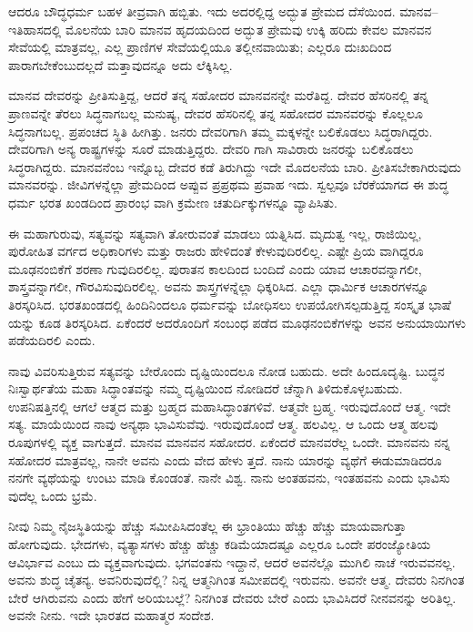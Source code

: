 ಆದರೂ ಬೌದ್ಧಧರ್ಮ ಬಹಳ ತೀವ್ರವಾಗಿ ಹಬ್ಬಿತು. ಇದು ಅದರಲ್ಲಿದ್ದ ಅದ್ಭುತ ಪ್ರೇಮದ ದೆಸೆಯಿಂದ. ಮಾನವ–ಇತಿಹಾಸದಲ್ಲಿ ಮೊಲನೆಯ ಬಾರಿ ಮಾನವ ಹೃದಯದಿಂದ ಅದ್ಭುತ ಪ್ರೇಮವು ಉಕ್ಕಿ ಹರಿದು ಕೇವಲ ಮಾನವನ ಸೇವೆಯಲ್ಲಿ ಮಾತ್ರವಲ್ಲ, ಎಲ್ಲ ಪ್ರಾಣಿಗಳ ಸೇವೆಯಲ್ಲಿಯೂ ತಲ್ಲೀನವಾಯಿತು; ಎಲ್ಲರೂ ದುಃಖದಿಂದ ಪಾರಾಗಬೇಕೆಂಬುದಲ್ಲದೆ ಮತ್ತಾವುದನ್ನೂ ಅದು ಲೆಕ್ಕಿಸಿಲ್ಲ.

ಮಾನವ ದೇವರನ್ನು ಪ್ರೀತಿಸುತ್ತಿದ್ದ, ಆದರೆ ತನ್ನ ಸಹೋದರ ಮಾನವನನ್ನೇ ಮರೆತಿದ್ದ. ದೇವರ ಹೆಸರಿನಲ್ಲಿ ತನ್ನ ಪ್ರಾಣವನ್ನೇ ತೆರಲು ಸಿದ್ಧನಾಗಬಲ್ಲ ಮನುಷ್ಯ, ದೇವರ ಹೆಸರಿನಲ್ಲಿ ತನ್ನ ಸಹೋದರ ಮಾನವರನ್ನು ಕೊಲ್ಲಲೂ ಸಿದ್ಧನಾಗಬಲ್ಲ. ಪ್ರಪಂಚದ ಸ್ಥಿತಿ ಹೀಗಿತ್ತು. ಜನರು ದೇವರಿಗಾಗಿ ತಮ್ಮ ಮಕ್ಕಳನ್ನೇ ಬಲಿಕೊಡಲು ಸಿದ್ಧರಾಗಿದ್ದರು. ದೇವರಿಗಾಗಿ ಅನ್ಯ ರಾಷ್ಟ್ರಗಳನ್ನು ಸೂರೆ ಮಾಡುತ್ತಿದ್ದರು. ದೇವರಿ ಗಾಗಿ ಸಾವಿರಾರು ಜನರನ್ನು ಬಲಿಕೊಡಲು ಸಿದ್ಧರಾಗಿದ್ದರು. ಮಾನವನೆಂಬ ಇನ್ನೊಬ್ಬ ದೇವರ ಕಡೆ ತಿರುಗಿದ್ದು ಇದೇ ಮೊದಲನೆಯ ಬಾರಿ. ಪ್ರೀತಿಸಬೇಕಾಗಿರುವುದು ಮಾನವರನ್ನು. ಜೀವಿಗಳನ್ನೆಲ್ಲಾ ಪ್ರೇಮದಿಂದ ಅಪ್ಪುವ ಪ್ರಪ್ರಥಮ ಪ್ರವಾಹ ಇದು. ಸ್ವಲ್ಪವೂ ಬೆರಕೆಯಾಗದ ಈ ಶುದ್ಧ ಧರ್ಮ ಭರತ ಖಂಡದಿಂದ ಪ್ರಾರಂಭ ವಾಗಿ ಕ್ರಮೇಣ ಚತುರ್ದಿಕ್ಕುಗಳನ್ನೂ ವ್ಯಾಪಿಸಿತು.

ಈ ಮಹಾಗುರುವು, ಸತ್ಯವನ್ನು ಸತ್ಯವಾಗಿ ತೋರುವಂತೆ ಮಾಡಲು ಯತ್ನಿಸಿದ. ಮೃದುತ್ವ ಇಲ್ಲ, ರಾಜಿಯಿಲ್ಲ, ಪುರೋಹಿತ ವರ್ಗದ ಅಧಿಕಾರಿಗಳು ಮತ್ತು ರಾಜರು ಹೇಳಿದಂತೆ ಕೇಳುವುದಿರಲಿಲ್ಲ. ಎಷ್ಟೇ ಪ್ರಿಯ ವಾಗಿದ್ದರೂ ಮೂಢನಂಬಿಕೆಗೆ ಶರಣಾ ಗುವುದಿರಲಿಲ್ಲ. ಪುರಾತನ ಕಾಲದಿಂದ ಬಂದಿದೆ ಎಂದು ಯಾವ ಆಚಾರವನ್ನಾಗಲೀ, ಶಾಸ್ತ್ರವನ್ನಾಗಲೀ, ಗೌರವಿಸುವುದಿರಲಿಲ್ಲ. ಅವನು ಶಾಸ್ತ್ರಗಳನ್ನೆಲ್ಲಾ ಧಿಕ್ಕರಿಸಿದ. ಎಲ್ಲಾ ಧಾರ್ಮಿಕ ಆಚಾರಗಳನ್ನೂ ತಿರಸ್ಕರಿಸಿದ. ಭರತಖಂಡದಲ್ಲಿ ಹಿಂದಿನಿಂದಲೂ ಧರ್ಮವನ್ನು ಬೋಧಿಸಲು ಉಪಯೋಗಿಸಲ್ಪಡುತ್ತಿದ್ದ ಸಂಸ್ಕೃತ ಭಾಷೆ ಯನ್ನು ಕೂಡ ತಿರಸ್ಕರಿಸಿದ. ಏಕೆಂದರೆ ಅದರೊಂದಿಗೆ ಸಂಬಂಧ ಪಡೆದ ಮೂಢನಂಬಿಕೆಗಳನ್ನು ಅವನ ಅನುಯಾಯಿಗಳು ಪಡೆಯದಿರಲಿ ಎಂದು.

ನಾವು ವಿವರಿಸುತ್ತಿರುವ ಸತ್ಯವನ್ನು ಬೇರೊಂದು ದೃಷ್ಟಿಯಿಂದಲೂ ನೋಡ ಬಹುದು. ಅದೇ ಹಿಂದೂದೃಷ್ಟಿ. ಬುದ್ಧನ ನಿಃಸ್ವಾರ್ಥತೆಯ ಮಹಾ ಸಿದ್ಧಾಂತವನ್ನು ನಮ್ಮ ದೃಷ್ಟಿಯಿಂದ ನೋಡಿದರೆ ಚೆನ್ನಾಗಿ ತಿಳಿದುಕೊಳ್ಳಬಹುದು. ಉಪನಿಷತ್ತಿನಲ್ಲಿ ಆಗಲೆ ಆತ್ಮದ ಮತ್ತು ಬ್ರಹ್ಮದ ಮಹಾಸಿದ್ಧಾಂತಗಳಿವೆ. ಆತ್ಮವೇ ಬ್ರಹ್ಮ. ಇರುವುದೊಂದೆ ಆತ್ಮ. ಇದೇ ಸತ್ಯ. ಮಾಯೆಯಿಂದ ನಾವು ಅನ್ಯಥಾ ಭಾವಿಸುವೆವು. ಇರುವುದೊಂದೆ ಆತ್ಮ. ಹಲವಿಲ್ಲ. ಆ ಒಂದು ಆತ್ಮ ಹಲವು ರೂಪುಗಳಲ್ಲಿ ವ್ಯಕ್ತ ವಾಗುತ್ತದೆ. ಮಾನವ ಮಾನವನ ಸಹೋದರ. ಏಕೆಂದರೆ ಮಾನವರೆಲ್ಲ ಒಂದೇ. ಮಾನವನು ನನ್ನ ಸಹೋದರ ಮಾತ್ರವಲ್ಲ, ನಾನೇ ಅವನು ಎಂದು ವೇದ ಹೇಳು ತ್ತದೆ. ನಾನು ಯಾರನ್ನು ವ್ಯಥೆಗೆ ಈಡುಮಾಡಿದರೂ ನನಗೇ ವ್ಯಥೆಯನ್ನು ಉಂಟು ಮಾಡಿ ಕೊಂಡಂತೆ. ನಾನೇ ವಿಶ್ವ. ನಾನು ಅಂತಹವನು, ಇಂತಹವನು ಎಂದು ಭಾವಿಸು ವುದೆಲ್ಲ ಒಂದು ಭ್ರಮೆ.

ನೀವು ನಿಮ್ಮ ನೈಜಸ್ಥಿತಿಯನ್ನು ಹೆಚ್ಚು ಸಮೀಪಿಸಿದಂತೆಲ್ಲ ಈ ಭ್ರಾಂತಿಯು ಹೆಚ್ಚು ಹೆಚ್ಚು ಮಾಯವಾಗುತ್ತಾ ಹೋಗುವುದು. ಭೇದಗಳು, ವ್ಯತ್ಯಾಸಗಳು ಹೆಚ್ಚು ಹೆಚ್ಚು ಕಡಿಮೆಯಾದಷ್ಟೂ ಎಲ್ಲರೂ ಒಂದೇ ಪರಂಜ್ಯೋತಿಯ ಆವಿರ್ಭಾವ ಎಂಬು ದು ವ್ಯಕ್ತವಾಗುವುದು. ಭಗವಂತನು ಇದ್ದಾನೆ, ಆದರೆ ಅವನೆಲ್ಲೊ ಮುಗಿಲಿ ನಾಚೆ ಇರುವವನಲ್ಲ. ಅವನು ಶುದ್ಧ ಚೈತನ್ಯ. ಅವನಿರುವುದೆಲ್ಲಿ? ನಿನ್ನ ಆತ್ಮನಿಗಿಂತ ಸಮೀಪದಲ್ಲಿ ಇರುವನು. ಅವನೇ ಆತ್ಮ. ದೇವರು ನಿನಗಿಂತ ಬೇರೆ ಆಗಿರುವನು ಎಂದು ಹೇಗೆ ಅರಿಯಬಲ್ಲೆ? ನಿನಗಿಂತ ದೇವರು ಬೇರೆ ಎಂದು ಭಾವಿಸಿದರೆ ನೀನವನನ್ನು ಅರಿತಿಲ್ಲ. ಅವನೇ ನೀನು. ಇದೇ ಭಾರತದ ಮಹಾತ್ಮರ ಸಂದೇಶ.

